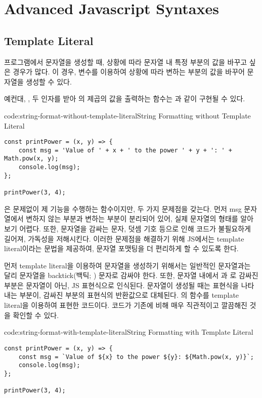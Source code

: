 \section{Advanced Javascript Syntaxes}\label{sect:advanced-javascript-syntaxes}

\subsection*{Template Literal}

프로그램에서 문자열을 생성할 때, 상황에 따라 문자열 내 특정 부분의 값을 바꾸고 싶은 경우가 많다. 이 경우, 변수를 이용하여 상황에 따라 변하는 부분의 값을 바꾸어 문자열을 생성할 수 있다.

예컨대, ,  두 인자를 받아 의  제곱의 값을 출력하는 함수는 과 같이 구현될 수 있다.

\begin{codeenv}{code:string-format-without-template-literal}{String Formatting without Template Literal}\begin{verbatim}
const printPower = (x, y) => {
    const msg = 'Value of ' + x + ' to the power ' + y + ': ' + Math.pow(x, y);
    console.log(msg);
};

printPower(3, 4);
\end{verbatim}
\end{codeenv}

은 문제없이 제 기능을 수행하는 함수이지만, 두 가지 문제점을 갖는다. 먼저 msg 문자열에서 변하지 않는 부분과 변하는 부분이 분리되어 있어, 실제 문자열의 형태를 알아보기 어렵다. 또한, 문자열을 감싸는 문자, 덧셈 기호 등으로 인해 코드가 불필요하게 길어져, 가독성을 저해시킨다. 이러한 문제점을 해결하기 위해 JS에서는 template literal이라는 문법을 제공하여, 문자열 포맷팅을 더 편리하게 할 수 있도록 한다.

먼저 template literal을 이용하여 문자열을 생성하기 위해서는 일반적인 문자열과는 달리 문자열을 backtick(백틱; ) 문자로 감싸야 한다. 또한, 문자열 내에서 \cd{\$\{}과 \cd{\}}로 감싸진 부분은 문자열이 아닌, JS 표현식으로 인식된다. 문자열이 생성될 때는 표현식을 나타내는 부분이, 감싸진 부분의 표현식의 반환값으로 대체된다.
\은 의 함수를 template literal을 이용하여 표현한 코드이다. 코드가 기존에 비해 매우 직관적이고 깔끔해진 것을 확인할 수 있다.

\begin{codeenv}{code:string-format-with-template-literal}{String Formatting with Template Literal}\begin{verbatim}
const printPower = (x, y) => {
    const msg = `Value of ${x} to the power ${y}: ${Math.pow(x, y)}`;
    console.log(msg);
};

printPower(3, 4);
\end{verbatim}
\end{codeenv}

